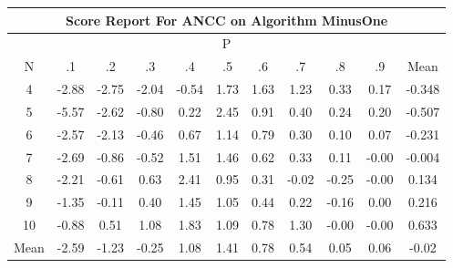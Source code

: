 \documentclass[11pt,a4paper]{report}
\begin{document}
\begin{longtable}{ | c || c | c | c | c | c | c | c | c | c || c |}
\hline
\multicolumn{11}{|c|}{ Score Report For ANCC on Algorithm MinusOne} \\
\hline
\multicolumn{11}{|c|}{ P } \\
\hline
N & .1 & .2 & .3 & .4 & .5 & .6 & .7 & .8 & .9 & Mean\\
 \hline
 \hline
 \endhead
  4 &  \cellcolor[HTML]{FFB7B7} -2.88 &  \cellcolor[HTML]{FFB7B7} -2.75 &  \cellcolor[HTML]{FFCFCF} -2.04 &  \cellcolor[HTML]{FFEFEF} -0.54 &  \cellcolor[HTML]{D7D7FF} 1.73 &  \cellcolor[HTML]{D7D7FF} 1.63 &  \cellcolor[HTML]{DFDFFF} 1.23 &  \cellcolor[HTML]{F7F7FF} 0.33 &  \cellcolor[HTML]{F7F7FF} 0.17 & -0.348 \\
  5 &  \cellcolor[HTML]{FF7070} -5.57 &  \cellcolor[HTML]{FFBFBF} -2.62 &  \cellcolor[HTML]{FFE7E7} -0.80 &  \cellcolor[HTML]{F7F7FF} 0.22 &  \cellcolor[HTML]{BFBFFF} 2.45 &  \cellcolor[HTML]{E7E7FF} 0.91 &  \cellcolor[HTML]{F7F7FF} 0.40 &  \cellcolor[HTML]{F7F7FF} 0.24 &  \cellcolor[HTML]{F7F7FF} 0.20 & -0.507 \\
  6 &  \cellcolor[HTML]{FFBFBF} -2.57 &  \cellcolor[HTML]{FFC7C7} -2.13 &  \cellcolor[HTML]{FFF7F7} -0.46 &  \cellcolor[HTML]{EFEFFF} 0.67 &  \cellcolor[HTML]{DFDFFF} 1.14 &  \cellcolor[HTML]{EFEFFF} 0.79 &  \cellcolor[HTML]{F7F7FF} 0.30 &  \cellcolor[HTML]{FFFFFF} 0.10 &  \cellcolor[HTML]{FFFFFF} 0.07 & -0.231 \\
  7 &  \cellcolor[HTML]{FFBFBF} -2.69 &  \cellcolor[HTML]{FFE7E7} -0.86 &  \cellcolor[HTML]{FFEFEF} -0.52 &  \cellcolor[HTML]{D7D7FF} 1.51 &  \cellcolor[HTML]{D7D7FF} 1.46 &  \cellcolor[HTML]{EFEFFF} 0.62 &  \cellcolor[HTML]{F7F7FF} 0.33 &  \cellcolor[HTML]{FFFFFF} 0.11 &  \cellcolor[HTML]{FFFFFF} -0.00 & -0.004 \\
  8 &  \cellcolor[HTML]{FFC7C7} -2.21 &  \cellcolor[HTML]{FFEFEF} -0.61 &  \cellcolor[HTML]{EFEFFF} 0.63 &  \cellcolor[HTML]{BFBFFF} 2.41 &  \cellcolor[HTML]{E7E7FF} 0.95 &  \cellcolor[HTML]{F7F7FF} 0.31 &  \cellcolor[HTML]{FFFFFF} -0.02 &  \cellcolor[HTML]{FFF7F7} -0.25 &  \cellcolor[HTML]{FFFFFF} -0.00 & 0.134 \\
  9 &  \cellcolor[HTML]{FFDFDF} -1.35 &  \cellcolor[HTML]{FFFFFF} -0.11 &  \cellcolor[HTML]{F7F7FF} 0.40 &  \cellcolor[HTML]{D7D7FF} 1.45 &  \cellcolor[HTML]{E7E7FF} 1.05 &  \cellcolor[HTML]{F7F7FF} 0.44 &  \cellcolor[HTML]{F7F7FF} 0.22 &  \cellcolor[HTML]{FFFFFF} -0.16 &  \cellcolor[HTML]{FFFFFF} 0.00 & 0.216 \\
  10 &  \cellcolor[HTML]{FFE7E7} -0.88 &  \cellcolor[HTML]{EFEFFF} 0.51 &  \cellcolor[HTML]{E7E7FF} 1.08 &  \cellcolor[HTML]{CFCFFF} 1.83 &  \cellcolor[HTML]{E7E7FF} 1.09 &  \cellcolor[HTML]{EFEFFF} 0.78 &  \cellcolor[HTML]{DFDFFF} 1.30 &  \cellcolor[HTML]{FFFFFF} -0.00 &  \cellcolor[HTML]{FFFFFF} -0.00 & 0.633 \\
 \hline
 \hline
Mean &  \cellcolor[HTML]{FFBFBF} -2.59 &  \cellcolor[HTML]{FFDFDF} -1.23 &  \cellcolor[HTML]{FFF7F7} -0.25 &  \cellcolor[HTML]{E7E7FF} 1.08 &  \cellcolor[HTML]{DFDFFF} 1.41 &  \cellcolor[HTML]{EFEFFF} 0.78 &  \cellcolor[HTML]{EFEFFF} 0.54 &  \cellcolor[HTML]{FFFFFF} 0.05 &  \cellcolor[HTML]{FFFFFF} 0.06 &  \cellcolor[HTML]{FFFFFF} -0.02
\end{longtable}
\end{document}
